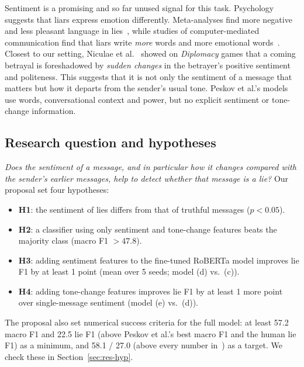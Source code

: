 \documentclass[conference]{IEEEtran}
\begin{document}
Sentiment is a promising and so far unused signal for this task. Psychology suggests that liars express emotion differently. Meta-analyses find more negative and less pleasant language in lies~\cite{depaulo2003cues,newman2003lying}, while studies of computer-mediated communication find that liars write \emph{more} words and more emotional words~\cite{hancock2008lying,zhou2004automating}. Closest to our setting, Niculae et al.~\cite{niculae2015harbingers} showed on \textit{Diplomacy} games that a coming betrayal is foreshadowed by \emph{sudden changes} in the betrayer's positive sentiment and politeness. This suggests that it is not only the sentiment of a message that matters but how it departs from the sender's usual tone. Peskov et al.'s models use words, conversational context and power, but no explicit sentiment or tone-change information.

\subsection{Research question and hypotheses}
\emph{Does the sentiment of a message, and in particular how it changes compared with the sender's earlier messages, help to detect whether that message is a lie?} Our proposal set four hypotheses:
\begin{itemize}
\item \textbf{H1}: the sentiment of lies differs from that of truthful messages ($p < 0.05$).
\item \textbf{H2}: a classifier using only sentiment and tone-change features beats the majority class (macro F1 $> 47.8$).
\item \textbf{H3}: adding sentiment features to the fine-tuned RoBERTa model improves lie F1 by at least 1 point (mean over 5 seeds; model (d) vs.\ (c)).
\item \textbf{H4}: adding tone-change features improves lie F1 by at least 1 more point over single-message sentiment (model (e) vs.\ (d)).
\end{itemize}
The proposal also set numerical success criteria for the full model: at least 57.2 macro F1 and 22.5 lie F1 (above Peskov et al.'s best macro F1 and the human lie F1) as a minimum, and 58.1 / 27.0 (above every number in~\cite{peskov2020takes}) as a target. We check these in Section~\ref{sec:res-hyp}.
\end{document}
